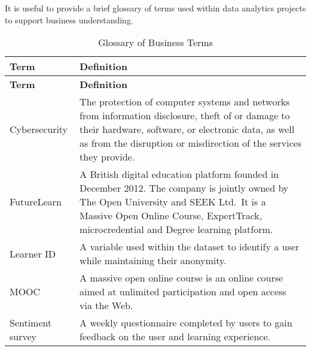 \documentclass[
]{article}
\begin{document}
It is useful to provide a brief glossary of terms used within data
analytics projects to support business understanding.

\begin{longtable}[]{@{}
  >{\raggedright\arraybackslash}p{}
  >{\raggedright\arraybackslash}p{}@{}}
\caption{Glossary of Business Terms}\tabularnewline
\toprule
\textbf{Term} & \textbf{Definition} \\
\midrule
\endfirsthead
\toprule
\textbf{Term} & \textbf{Definition} \\
\midrule
\endhead
Cybersecurity & The protection of computer systems and networks from
information disclosure, theft of or damage to their hardware, software,
or electronic data, as well as from the disruption or misdirection of
the services they provide. \\
FutureLearn & A British digital education platform founded in December
2012. The company is jointly owned by The Open University and SEEK
Ltd.~It is a Massive Open Online Course, ExpertTrack, microcredential
and Degree learning platform. \\
Learner ID & A variable used within the dataset to identify a user while
maintaining their anonymity. \\
MOOC & A massive open online course is an online course aimed at
unlimited participation and open access via the Web. \\
Sentiment survey & A weekly questionnaire completed by users to gain
feedback on the user and learning experience. \\
\bottomrule
\end{longtable}
\end{document}
